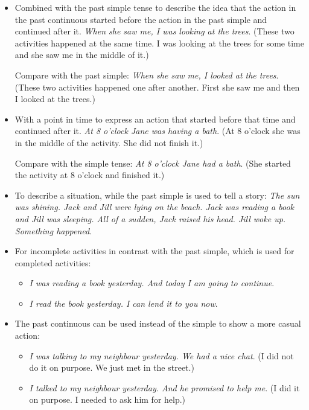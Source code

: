 \begin{itemize}
\item Combined with the past simple tense to describe the idea that the action in the past continuous started before the action in the past simple and continued after it. \textit{When she saw me, I was looking at the trees}. (These two activities happened at the same time. I was looking at the trees for some time and she saw me in the middle of it.)

Compare with the past simple: \textit{When she saw me, I looked at the trees}. (These two activities happened one after another. First she saw me and then I looked at the trees.)

\item With a point in time to express an action that started before that time and continued after it. \textit{At 8 o'clock Jane was having a bath}. (At 8 o'clock she was in the middle of the activity. She did not finish it.)

Compare with the simple tense: \textit{At 8 o'clock Jane had a bath}. (She started the activity at 8 o'clock and finished it.)

\item To describe a situation, while the past simple is used to tell a story: \textit{The sun was shining. Jack and Jill were lying on the beach. Jack was reading a book and Jill was sleeping. All of a sudden, Jack raised his head. Jill woke up. Something happened}.

\item For incomplete activities in contrast with the past simple, which is used for completed activities:
\begin{itemize}
\item \textit{I was reading a book yesterday. And today I am going to continue}.
\item \textit{I read the book yesterday. I can lend it to you now}.
\end{itemize}

\item The past continuous can be used instead of the simple to show a more casual action:

\begin{itemize}
\item \textit{I was talking to my neighbour yesterday. We had a nice chat}. (I did not do it on purpose. We just met in the street.) 
\item \textit{I talked to my neighbour yesterday. And he promised to help me}. (I did it on purpose. I needed to ask him for help.)
\end{itemize}

\end{itemize}

